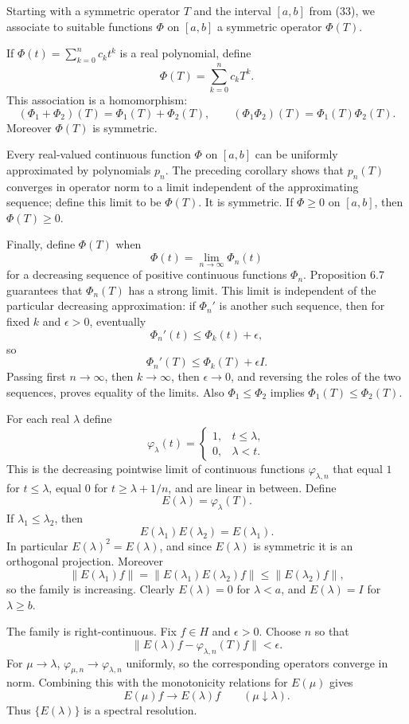 \documentclass[11pt,openany]{book}
\begin{document}
Starting with a symmetric operator $T$ and the interval $[a,b]$ from (33), we associate to suitable functions $\Phi$ on $[a,b]$ a symmetric operator $\Phi(T)$.

If $\Phi(t)=\sum_{k=0}^{n}c_kt^k$ is a real polynomial, define
\[
\Phi(T)=\sum_{k=0}^{n}c_kT^k.
\]
This association is a homomorphism:
\[
(\Phi_1+\Phi_2)(T)=\Phi_1(T)+\Phi_2(T),
\qquad
(\Phi_1\Phi_2)(T)=\Phi_1(T)\Phi_2(T).
\]
Moreover $\Phi(T)$ is symmetric.

Every real-valued continuous function $\Phi$ on $[a,b]$ can be uniformly approximated by polynomials $p_n$. The preceding corollary shows that $p_n(T)$ converges in operator norm to a limit independent of the approximating sequence; define this limit to be $\Phi(T)$. It is symmetric. If $\Phi\geq0$ on $[a,b]$, then $\Phi(T)\geq0$.

Finally, define $\Phi(T)$ when
\[
\Phi(t)=\lim_{n\to\infty}\Phi_n(t)
\]
for a decreasing sequence of positive continuous functions $\Phi_n$. Proposition 6.7 guarantees that $\Phi_n(T)$ has a strong limit. This limit is independent of the particular decreasing approximation: if $\Phi_n'$ is another such sequence, then for fixed $k$ and $\epsilon>0$, eventually
\[
\Phi_n'(t)\leq\Phi_k(t)+\epsilon,
\]
so
\[
\Phi_n'(T)\leq\Phi_k(T)+\epsilon I.
\]
Passing first $n\to\infty$, then $k\to\infty$, then $\epsilon\to0$, and reversing the roles of the two sequences, proves equality of the limits. Also $\Phi_1\leq\Phi_2$ implies $\Phi_1(T)\leq\Phi_2(T)$.

For each real $\lambda$ define
\[
\varphi_\lambda(t)=
\begin{cases}
1,&t\leq\lambda,\\
0,&\lambda<t.
\end{cases}
\]
This is the decreasing pointwise limit of continuous functions $\varphi_{\lambda,n}$ that equal $1$ for $t\leq\lambda$, equal $0$ for $t\geq\lambda+1/n$, and are linear in between. Define
\[
E(\lambda)=\varphi_\lambda(T).
\]
If $\lambda_1\leq\lambda_2$, then
\[
E(\lambda_1)E(\lambda_2)=E(\lambda_1).
\]
In particular $E(\lambda)^2=E(\lambda)$, and since $E(\lambda)$ is symmetric it is an orthogonal projection. Moreover
\[
\|E(\lambda_1)f\|
=\|E(\lambda_1)E(\lambda_2)f\|
\leq\|E(\lambda_2)f\|,
\]
so the family is increasing. Clearly $E(\lambda)=0$ for $\lambda<a$, and $E(\lambda)=I$ for $\lambda\geq b$.

The family is right-continuous. Fix $f\in H$ and $\epsilon>0$. Choose $n$ so that
\[
\|E(\lambda)f-\varphi_{\lambda,n}(T)f\|<\epsilon.
\]
For $\mu\to\lambda$, $\varphi_{\mu,n}\to\varphi_{\lambda,n}$ uniformly, so the corresponding operators converge in norm. Combining this with the monotonicity relations for $E(\mu)$ gives
\[
E(\mu)f\to E(\lambda)f
\qquad(\mu\downarrow\lambda).
\]
Thus $\{E(\lambda)\}$ is a spectral resolution.
\end{document}

